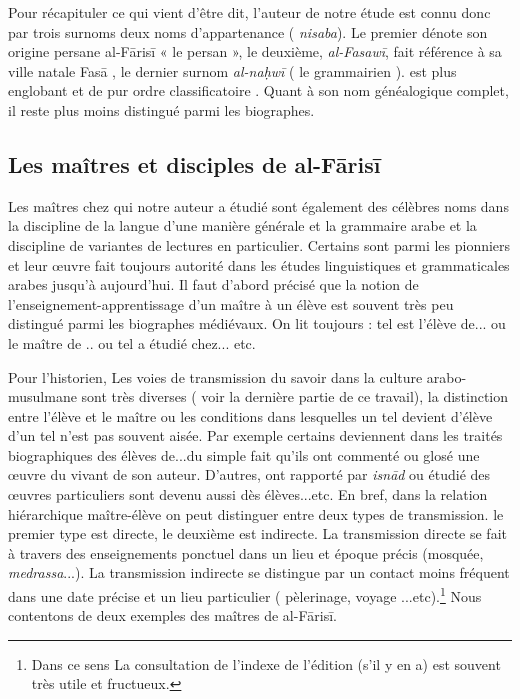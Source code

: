 \documentclass[a4paper,12pt]{report}
\begin{document}
\begin{itemize}
Pour récapituler ce qui vient d’être dit, l’auteur de notre étude est connu donc par trois surnoms deux noms d’appartenance ( \textit{nisaba}).  Le premier dénote son origine persane al-Fārisī « le persan », le deuxième, \textit{al-Fasaw\=i}, fait référence à sa ville natale  Fasā , le dernier surnom \textit{al-naḥwī} (
le grammairien ). est plus englobant et de pur ordre classificatoire . Quant à son nom généalogique complet, il reste plus moins distingué parmi les biographes. 


\subsection{Les maîtres et disciples de al-Fārisī }


Les maîtres chez qui notre auteur a étudié sont également des célèbres noms dans la discipline de la langue  d’une manière générale  et la grammaire arabe et la discipline de variantes de lectures en particulier. Certains sont parmi les pionniers et leur œuvre fait toujours autorité dans les études linguistiques et grammaticales arabes jusqu’à aujourd’hui. Il faut d'abord précisé que la notion de l'enseignement-apprentissage d'un maître à un élève est  souvent  très peu distingué parmi les biographes  médiévaux. On lit  toujours : tel est l'élève de...  ou le maître de ..  ou tel a étudié chez... etc.

Pour l'historien, Les voies de transmission du savoir dans la culture arabo-musulmane sont très diverses ( voir la dernière partie de ce travail), la distinction entre l'élève et le maître ou les conditions dans lesquelles un tel devient d'élève d'un tel  n'est pas souvent aisée. Par exemple certains deviennent dans les traités biographiques des élèves de...du simple fait qu'ils  ont commenté ou glosé une œuvre du vivant de son auteur.  D'autres,  ont rapporté par \textit{isn\=ad} ou étudié des œuvres particuliers sont devenu aussi dès élèves...etc. En bref, dans la relation hiérarchique maître-élève on peut distinguer entre deux types de transmission. le premier type est directe, le deuxième  est indirecte. La transmission directe  se fait à travers des enseignements ponctuel dans un lieu et époque précis (mosquée, \textit{medrassa}...). La transmission indirecte se distingue par un contact moins fréquent dans une date précise et un lieu particulier ( pèlerinage, voyage ...etc).\footnote{ Dans ce sens La consultation de l'indexe de l'édition (s'il y en a) est souvent très utile et fructueux.   }   Nous contentons de deux exemples des maîtres de  al-Fāris\=i.       


\end{itemize}
\end{document}
